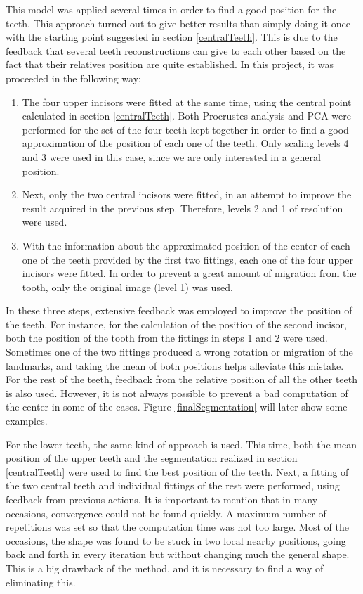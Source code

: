 \documentclass[a4paper,11pt,twoside]{article}
\begin{document}
This model was applied several times in order to find a good position for the teeth. This approach turned out to give better results than simply doing it once with the starting point suggested in section \textsection\ref{centralTeeth}. This is due to the feedback that several teeth reconstructions can give to each other based on the fact that their relatives position are quite established. In this project, it was proceeded in the following way:

\begin{enumerate}

\item The four upper incisors were fitted at the same time, using the central point calculated in section \textsection\ref{centralTeeth}. Both Procrustes analysis and PCA were performed for the set of the four teeth kept together in order to find a good approximation of the position of each one of the teeth. Only scaling levels 4 and 3 were used in this case, since we are only interested in a general position.

\item Next, only the two central incisors were fitted, in an attempt to improve the result acquired in the previous step. Therefore, levels 2 and 1 of resolution were used.

\item With the information about the approximated position of the center of each one of the teeth provided by the first two fittings, each one of the four upper incisors were fitted. In order to prevent a great amount of migration from the tooth, only the original image (level 1) was used. 
\end{enumerate}

In these three steps, extensive feedback was employed to improve the position of the teeth. For instance, for the calculation of the position of the second incisor, both the position of the tooth from the fittings in steps 1 and 2 were used. Sometimes one of the two fittings produced a wrong rotation or migration of the landmarks, and taking the mean of both positions helps alleviate this mistake. For the rest of the teeth, feedback from the relative position of all the other teeth is also used. However, it is not always possible to prevent a bad computation of the center in some of the cases. Figure \ref{finalSegmentation} will later show some examples.

For the lower teeth, the same kind of approach is used. This time, both the mean position of the upper teeth and the segmentation realized in section \textsection\ref{centralTeeth} were used to find the best position of the teeth. Next, a fitting of the two central teeth and individual fittings of the rest were performed, using feedback from previous actions. It is important to mention that in many occasions, convergence could not be found quickly. A maximum number of repetitions was set so that the computation time was not too large. Most of the occasions, the shape was found to be stuck in two local nearby positions, going back and forth in every iteration but without changing much the general shape. This is a big drawback of the method, and it is necessary to find a way of eliminating this.
\end{document}
